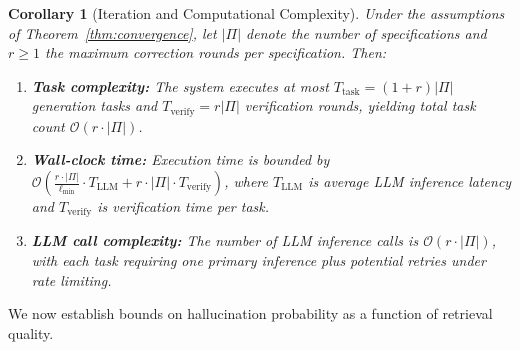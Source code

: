 \documentclass{ieeeaccess}
\newtheorem{corollary}[theorem]{Corollary}
\begin{document}
\begin{corollary}[Iteration and Computational Complexity]
\label{cor:complexity}
Under the assumptions of Theorem~\ref{thm:convergence}, let \(|\Pi|\) denote the number of specifications and \(r \geq 1\) the maximum correction rounds per specification. Then:
\begin{enumerate}
\item \textbf{Task complexity:} The system executes at most \(T_{\text{task}} = (1 + r)|\Pi|\) generation tasks and \(T_{\text{verify}} = r|\Pi|\) verification rounds, yielding total task count \(\mathcal{O}(r \cdot |\Pi|)\).
\item \textbf{Wall-clock time:} Execution time is bounded by \(\mathcal{O}\left(\frac{r \cdot |\Pi|}{\ell_{\min}} \cdot T_{\text{LLM}} + r \cdot |\Pi| \cdot T_{\text{verify}}\right)\), where \(T_{\text{LLM}}\) is average LLM inference latency and \(T_{\text{verify}}\) is verification time per task.
\item \textbf{LLM call complexity:} The number of LLM inference calls is \(\mathcal{O}(r \cdot |\Pi|)\), with each task requiring one primary inference plus potential retries under rate limiting.
\end{enumerate}
\end{corollary}

We now establish bounds on hallucination probability as a function of retrieval quality.
\end{document}
